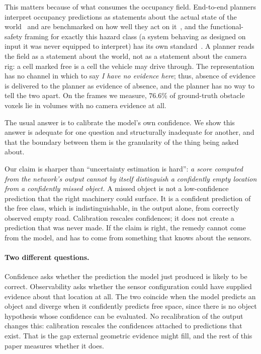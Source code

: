 \documentclass[10pt,twocolumn,letterpaper]{article}
\begin{document}
This matters because of what consumes the occupancy field. End-to-end
planners interpret occupancy predictions as statements about the actual
state of the world~\cite{hu2023uniad, chen2024vadv2} and are benchmarked on how well
they act on it~\cite{dauner2024navsim}, and the functional-safety framing
for exactly this hazard class (a system behaving as designed on input it
was never equipped to interpret) has its own
standard~\cite{iso21448}. A planner reads the field as a statement about
the world, not as a statement about the camera rig:
a cell marked free is a cell the vehicle may drive through. The
representation has no channel in which to say \emph{I have no evidence
here}; thus, absence of evidence is delivered to the planner as evidence
of absence, and the planner has no way to tell the two apart. On the frames we
measure, $76.6\%$ of ground-truth obstacle voxels lie in volumes with no
camera evidence at all.

The usual answer is to calibrate the model's own confidence. We show this
answer is adequate for one question and structurally inadequate for
another, and that the boundary between them is the granularity of the
thing being asked about.

Our claim is sharper than ``uncertainty estimation is hard'':
\emph{a score computed from the network's output cannot by itself
distinguish a confidently empty location from a confidently missed object.} A missed
object is not a low-confidence prediction that the right machinery could
surface. It is a confident prediction of the free class, which is
indistinguishable, in the output alone, from correctly observed empty road.
Calibration rescales confidences; it does not create a prediction that was
never made. If the claim is right, the remedy cannot come from the model,
and has to come from something that knows about the sensors.

\paragraph{Two different questions.} Confidence asks whether the
prediction the model just produced is likely to be correct. Observability
asks whether the sensor configuration could have supplied evidence about
that location at all. The two coincide when the model predicts an object
and diverge when it confidently predicts free space, since there is no
object hypothesis whose confidence can be evaluated. No
recalibration of the output changes this: calibration rescales the
confidences attached to predictions that exist. That is the gap external
geometric evidence might fill, and the rest of this paper measures whether
it does.
\end{document}
